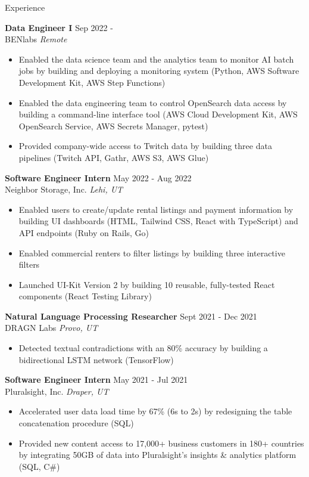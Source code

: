 \documentclass{resume} %
\begin{document}
\begin{rSection}{Experience}

\textbf{Data Engineer I} \hfill Sep 2022 - \\
BENlabs \hfill \textit{Remote}
\begin{itemize}
   \itemsep -2pt {} 
   \item Enabled the data science team and the analytics team to monitor AI batch jobs by 
   building and deploying a monitoring system (Python, AWS Software Development Kit, AWS Step Functions)
   \item Enabled the data engineering team to control OpenSearch data access by 
   building a command-line interface tool (AWS Cloud Development Kit, AWS OpenSearch Service, AWS Secrets Manager, pytest)
   \item Provided company-wide access to Twitch data by building three data pipelines (Twitch API, Gathr, AWS S3, AWS Glue)
\end{itemize}
 
\textbf{Software Engineer Intern} \hfill May 2022 - Aug 2022\\
Neighbor Storage, Inc. \hfill \textit{Lehi, UT}
 \begin{itemize}
    \itemsep -2pt {} 
    \item Enabled users to create/update rental listings and payment information by building 
    UI dashboards (HTML, Tailwind CSS, React with TypeScript) and API endpoints (Ruby on Rails, 
    Go)
    \item Enabled commercial renters to filter listings by building three interactive filters
    \item Launched UI-Kit Version 2 by building 10 reusable, fully-tested React components 
    (React Testing Library)
 \end{itemize}

\textbf{Natural Language Processing Researcher} \hfill Sept 2021 - Dec 2021\\
DRAGN Labs \hfill \textit{Provo, UT}
 \begin{itemize}
    \itemsep -2pt {} 
    \item Detected textual contradictions with an 80\% accuracy by building a bidirectional LSTM network (TensorFlow)
 \end{itemize}

\textbf{Software Engineer Intern} \hfill May 2021 - Jul 2021\\
Pluralsight, Inc. \hfill \textit{Draper, UT}
 \begin{itemize}
    \itemsep -2pt {} 
    \item Accelerated user data load time by 67\% (6s to 2s) by redesigning the table 
    concatenation procedure (SQL)
    \item Provided new content access to 17,000+ business customers in 180+ countries by 
    integrating 50GB of data into Pluralsight's insights \& analytics platform (SQL, C\#)
 \end{itemize}


\end{rSection}
\end{document}
